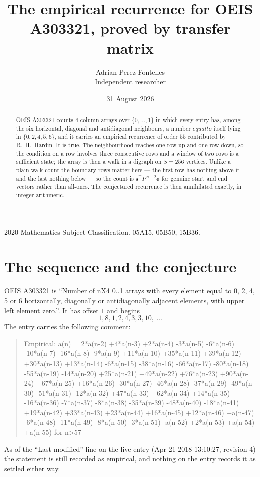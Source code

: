 \documentclass[11pt,a4paper]{article}
\title{The empirical recurrence for OEIS A303321, proved by transfer matrix}
\author{Adrian Perez Fontelles\\ \small Independent researcher}
\date{31 August 2026}
\theoremstyle{plain}
\theoremstyle{definition}
\begin{document}
\maketitle

\begin{abstract}
OEIS A303321 counts $4$-column arrays over $\{0,\dots,1\}$ in which every entry has,
among the six horizontal, diagonal and antidiagonal neighbours, a number $equal to$ itself lying in $\{0,2,4,5,6\}$, and it carries an empirical
recurrence of order $55$ contributed by R.~H.~Hardin. It is true. The neighbourhood
reaches one row up and one row down, so the condition on a row involves three consecutive
rows and a window of two rows is a sufficient state; the array is then a walk in a digraph
on $S=256$ vertices. Unlike a plain walk count the boundary rows matter here --- the first
row has nothing above it and the last nothing below --- so the count is
$\mathbf{s}^{\!\top}P^{\,n-2}\mathbf{e}$ for genuine start and end vectors rather than
all-ones. The conjectured recurrence is then annihilated exactly, in integer arithmetic.
\end{abstract}

\noindent\small 2020 Mathematics Subject Classification. 05A15, 05B50, 15B36.\normalsize

\section{The sequence and the conjecture}

OEIS A303321 is ``Number of nX4 0..1 arrays with every element equal to 0, 2, 4, 5 or 6 horizontally, diagonally or antidiagonally adjacent elements, with upper left element zero.''. It has offset
$1$ and begins
\[
1, 8, 1, 2, 4, 3, 3, 10,\ \dots
\]
The entry carries the following comment:
\begin{quote}\small
Empirical: a(n) = 2*a(n-2) +4*a(n-3) +2*a(n-4) -3*a(n-5) -6*a(n-6) -10*a(n-7) -16*a(n-8) -9*a(n-9) +11*a(n-10) +35*a(n-11) +39*a(n-12) +30*a(n-13) +13*a(n-14) -6*a(n-15) -38*a(n-16) -66*a(n-17) -80*a(n-18) -55*a(n-19) -14*a(n-20) +25*a(n-21) +49*a(n-22) +76*a(n-23) +90*a(n-24) +67*a(n-25) +16*a(n-26) -30*a(n-27) -46*a(n-28) -37*a(n-29) -49*a(n-30) -51*a(n-31) -12*a(n-32) +47*a(n-33) +62*a(n-34) +14*a(n-35) -16*a(n-36) -7*a(n-37) -8*a(n-38) -35*a(n-39) -48*a(n-40) -18*a(n-41) +19*a(n-42) +33*a(n-43) +23*a(n-44) +16*a(n-45) +12*a(n-46) +a(n-47) -6*a(n-48) -11*a(n-49) -8*a(n-50) -3*a(n-51) -a(n-52) +2*a(n-53) +a(n-54) +a(n-55) for n>57
\end{quote}
As of the ``Last modified'' line on the live entry (Apr 21 2018 13:10:27, revision
4) the statement is still recorded as empirical, and nothing on the entry
records it as settled either way.
\end{document}
